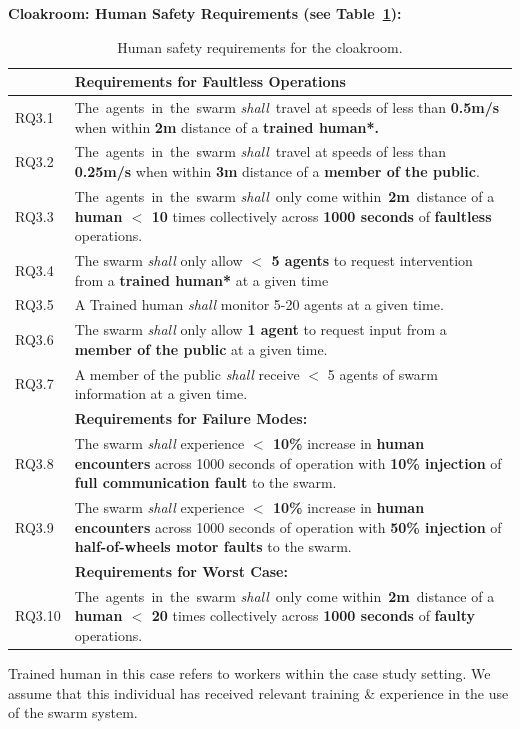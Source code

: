 \documentclass[lettersize,journal]{IEEEtran}
\begin{document}
\noindent \textbf{Cloakroom: Human Safety Requirements (see Table~\ref{tab:human-s}):}
\begin{table}[!h]
	\centering
	\begin{tabular}{|p{9mm}|p{72mm}|}
		\hline
		& \textbf{Requirements for Faultless Operations} \\
		\hline
		RQ3.1 & The agents in the swarm \emph{shall} travel at speeds of less than \textbf{0.5m/s} when within \textbf{2m} distance of a \textbf{trained human*.}
		\\ 
		\hline
		RQ3.2 & The agents in the swarm \emph{shall} travel at speeds of less than \textbf{0.25m/s} when within \textbf{3m} distance of a \textbf{member of the public}.
		\\ 
		\hline
		RQ3.3 & The agents in the swarm \emph{shall} only come within \textbf{2m} distance of a \textbf{human $<$ 10} times collectively across \textbf{1000 seconds} of \textbf{faultless} operations.
		\\ 
		\hline
		RQ3.4 & The swarm \emph{shall} only allow \textbf{$<$ 5 agents} to request intervention from a \textbf{trained human*} at a given time
		\\ 
		\hline
		RQ3.5 & A Trained human \emph{shall} monitor 5-20 agents at a given time.
		\\ 
		\hline
		RQ3.6 & The swarm \emph{shall} only allow \textbf{1 agent} to request input from a \textbf{member of the public} at a given time.
		\\ 
		\hline
		RQ3.7 & A member of the public \emph{shall} receive $<$ 5 agents of swarm information at a given time.
		\\ 
		\hline
		& \textbf{Requirements for Failure Modes: } \\
		\hline
		RQ3.8 & The swarm \emph{shall} experience \textbf{$<$ 10\%} increase in \textbf{human encounters} across 1000 seconds of operation with \textbf{10\% injection} of \textbf{full communication fault} to the swarm. \\
		\hline
		RQ3.9 & The swarm \emph{shall} experience \textbf{$<$ 10\%} increase in \textbf{human encounters }across 1000 seconds of operation with \textbf{50\% injection} of \textbf{half-of-wheels motor faults} to the swarm.\\ 
		\hline
		& \textbf{Requirements for Worst Case: } \\
		\hline
		RQ3.10 & The agents in the swarm \emph{shall} only come within \textbf{2m} distance of a \textbf{human $<$ 20} times collectively across \textbf{1000 seconds} of \textbf{faulty} operations.
		\\		[1ex] 		
		\hline
	\end{tabular}
	\caption{\label{tab:human-s}Human safety requirements for the cloakroom.}
\end{table}   
\noindent *Trained human in this case refers to workers within the case study setting. We assume that this individual has received relevant training \& experience in the use of the swarm system.\\
\end{document}

